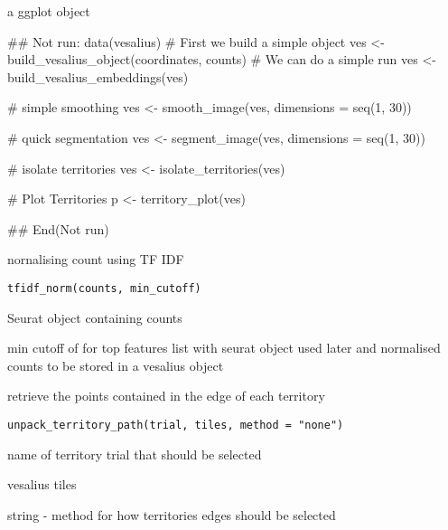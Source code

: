 \documentclass[a4paper]{book}
\begin{document}
%
\begin{Value}
a ggplot object
\end{Value}
%
\begin{Examples}
\begin{ExampleCode}
## Not run: 
data(vesalius)
# First we build a simple object
ves <- build_vesalius_object(coordinates, counts)
# We can do a simple run
ves <- build_vesalius_embeddings(ves)

# simple smoothing
ves <- smooth_image(ves, dimensions = seq(1, 30))

# quick segmentation
ves <- segment_image(ves, dimensions = seq(1, 30))

# isolate territories
ves <- isolate_territories(ves)

# Plot Territories
p <- territory_plot(ves)

## End(Not run)
\end{ExampleCode}
\end{Examples}
%
\begin{Description}
nornalising count using TF IDF
\end{Description}
%
\begin{Usage}
\begin{verbatim}
tfidf_norm(counts, min_cutoff)
\end{verbatim}
\end{Usage}
%
\begin{Arguments}
\begin{ldescription}
\item[\code{counts}] Seurat object containing counts

\item[\code{min\_cutoff}] min cutoff of for top features
list with seurat object used later and normalised counts to be stored
in a vesalius object
\end{ldescription}
\end{Arguments}
%
\begin{Description}
retrieve the points contained in the edge of each territory
\end{Description}
%
\begin{Usage}
\begin{verbatim}
unpack_territory_path(trial, tiles, method = "none")
\end{verbatim}
\end{Usage}
%
\begin{Arguments}
\begin{ldescription}
\item[\code{trial}] name of territory trial that should be selected

\item[\code{tiles}] vesalius tiles

\item[\code{method}] string - method for how territories edges should be
selected
\end{ldescription}
\end{Arguments}
\end{document}
